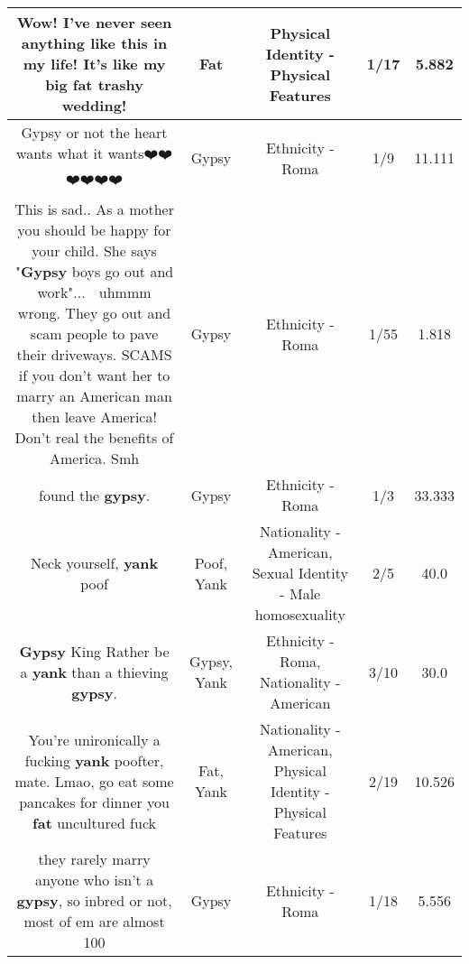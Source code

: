 \documentclass[11pt]{article}
\newlength\mylength
\begin{document}
\begin{center}
\begin{longtable}{|C{.65\mylength}|C{.30\mylength}|C{.12\mylength}|C{.12\mylength}|C{.12\mylength}|}
  \small Wow! I've never seen anything like this in my life! It's like my big \textbf{fat} trashy wedding!\normalsize   & Fat & Physical Identity - Physical Features & 1/17 & 5.882 \\  \hline
  \small Gypsy or not the heart wants what it wants❤️❤️❤️❤️❤️❤️\normalsize   & Gypsy & Ethnicity - Roma & 1/9 & 11.111 \\  \hline
  \small This is sad.. As a mother you should be happy for your child. She says "\textbf{Gypsy} boys go out and work"... 🤔 uhmmm wrong. They go out and scam people to pave their driveways. SCAMS if you don't want her to marry an American man then leave America! Don't real the benefits of America. Smh\normalsize   & Gypsy & Ethnicity - Roma & 1/55 & 1.818 \\  \hline
  \small found the \textbf{gypsy}.\normalsize   & Gypsy & Ethnicity - Roma & 1/3 & 33.333 \\  \hline
  \small {} Neck yourself, \textbf{yank} poof\normalsize   & Poof, Yank & Nationality - American, Sexual Identity - Male homosexuality & 2/5 & 40.0 \\  \hline
  \small \@\textbf{Gypsy} King Rather be a \textbf{yank} than a thieving \textbf{gypsy}.\normalsize   & Gypsy, Yank & Ethnicity - Roma, Nationality - American & 3/10 & 30.0 \\  \hline
  \small {} You're unironically a fucking \textbf{yank} poofter, mate. Lmao, go eat some pancakes for dinner you \textbf{fat} uncultured fuck\normalsize   & Fat, Yank & Nationality - American, Physical Identity - Physical Features & 2/19 & 10.526 \\  \hline
  \small they rarely marry anyone who isn't a \textbf{gypsy}, so inbred or not, most of em are almost 100\normalsize   & Gypsy & Ethnicity - Roma & 1/18 & 5.556 \\  \hline

\end{longtable}
\end{center}
\end{document}
